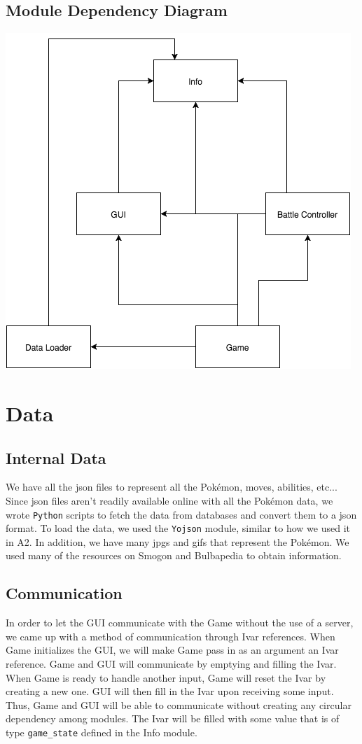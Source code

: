 \documentclass{scrreprt}
\begin{document}
\subsection{Module Dependency Diagram}
\includegraphics[scale=0.75]{MDD.png}

\section{Data}
\subsection{Internal Data}
We have all the json files to represent all the Pok\'emon, moves, abilities, etc... Since json files aren't readily available online with all the Pok\'emon data, we wrote \texttt{Python} scripts to fetch the data from databases and convert them to a json format. To load the data, we used the \texttt{Yojson} module, similar to how we used it in A2. In addition, we have many jpgs and gifs that represent the Pok\'emon. We used many of the resources on Smogon and Bulbapedia to obtain information.

\subsection{Communication}
In order to let the GUI communicate with the Game without the use of a server, we came up with a method of communication through Ivar references. When Game initializes the GUI, we will make Game pass in as an argument an Ivar reference. Game and GUI will communicate by emptying and filling the Ivar. When Game is ready to handle another input, Game will reset the Ivar by creating a new one. GUI will then fill in the Ivar upon receiving some input. Thus, Game and GUI will be able to communicate without creating any circular dependency among modules. The Ivar will be filled with some value that is of type \texttt{game\_state} defined in the Info module. 
\end{document}
